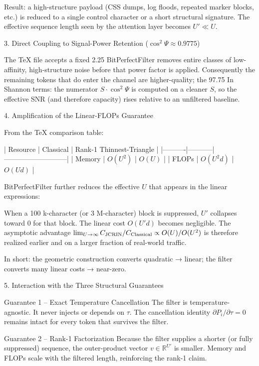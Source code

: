 Result: a high-structure payload (CSS dumps, log floods, repeated marker blocks, etc.) is reduced to a single control character or a short structural signature. The effective sequence length seen by the attention layer becomes \( U' \ll U \).

3. Direct Coupling to Signal-Power Retention (\( \cos^2\Psi \approx 0.9775 \))

The TeX file accepts a fixed 2.25 %
BitPerfectFilter removes entire classes of low-affinity, high-structure noise before that power factor is applied.
Consequently the remaining tokens that do enter the channel are higher-quality; the 97.75 %
In Shannon terms: the numerator \( S\cdot\cos^2\Psi \) is computed on a cleaner \( S \), so the effective SNR (and therefore capacity) rises relative to an unfiltered baseline.

4. Amplification of the Linear-FLOPs Guarantee

From the TeX comparison table:

| Resource | Classical | Rank-1 Thinnest-Triangle |
|----------|-----------|---------------------------|
| Memory   | \( O(U^2) \) | \( O(U) \) |
| FLOPs    | \( O(U^2 d) \) | \( O(U d) \) |

BitPerfectFilter further reduces the effective \( U \) that appears in the linear expressions:

When a 100 k-character (or 3 M-character) block is suppressed, \( U' \) collapses toward 0 for that block.
The linear cost \( O(U' d) \) becomes negligible.
The asymptotic advantage \( \lim_{U\to\infty} C_{\rm JCRIN}/C_{\rm Classical} \propto O(U)/O(U^2) \) is therefore realized earlier and on a larger fraction of real-world traffic.

In short: the geometric construction converts quadratic → linear; the filter converts many linear costs → near-zero.

5. Interaction with the Three Structural Guarantees

Guarantee 1 – Exact Temperature Cancellation  
The filter is temperature-agnostic. It never injects or depends on \( \tau \). The cancellation identity \( \partial P_i/\partial\tau = 0 \) remains intact for every token that survives the filter.

Guarantee 2 – Rank-1 Factorization  
Because the filter supplies a shorter (or fully suppressed) sequence, the outer-product vector \( v\in\mathbb{R}^{U'} \) is smaller. Memory and FLOPs scale with the filtered length, reinforcing the rank-1 claim.

